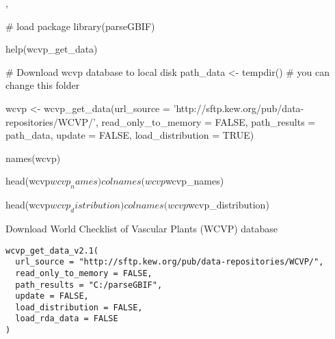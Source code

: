 \documentclass[a4paper]{book}
\begin{document}
%
\begin{SeeAlso}
, 
\end{SeeAlso}
%
\begin{Examples}
\begin{ExampleCode}

# load package
library(parseGBIF)

help(wcvp_get_data)

# Download wcvp database to local disk
path_data <- tempdir() # you can change this folder

wcvp <- wcvp_get_data(url_source = 'http://sftp.kew.org/pub/data-repositories/WCVP/',
                 read_only_to_memory = FALSE,
                 path_results = path_data,
                 update = FALSE,
                 load_distribution = TRUE)

names(wcvp)

head(wcvp$wcvp_names)
colnames(wcvp$wcvp_names)

head(wcvp$wcvp_distribution)
colnames(wcvp$wcvp_distribution)


\end{ExampleCode}
\end{Examples}
%
\begin{Description}
Download World Checklist of Vascular Plants (WCVP) database
\end{Description}
%
\begin{Usage}
\begin{verbatim}
wcvp_get_data_v2.1(
  url_source = "http://sftp.kew.org/pub/data-repositories/WCVP/",
  read_only_to_memory = FALSE,
  path_results = "C:/parseGBIF",
  update = FALSE,
  load_distribution = FALSE,
  load_rda_data = FALSE
)
\end{verbatim}
\end{Usage}
%
\end{document}
